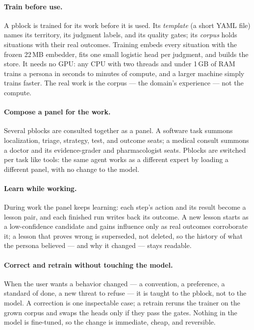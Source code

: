 \documentclass[11pt]{article}
\begin{document}
\paragraph{Train before use.} A pblock is trained for its work before it is used. Its \emph{template} (a short YAML file) names its territory, its judgment labels, and its quality gates; its \emph{corpus} holds situations with their real outcomes. Training embeds every situation with the frozen 22\,MB embedder, fits one small logistic head per judgment, and builds the store. It needs no GPU: any CPU with two threads and under 1\,GB of RAM trains a persona in seconds to minutes of compute, and a larger machine simply trains faster. The real work is the corpus --- the domain's experience --- not the compute.

\paragraph{Compose a panel for the work.} Several pblocks are consulted together as a panel. A software task summons localization, triage, strategy, test, and outcome seats; a medical consult summons a doctor and its evidence-grader and pharmacologist seats. Pblocks are switched per task like tools: the same agent works as a different expert by loading a different panel, with no change to the model.

\paragraph{Learn while working.} During work the panel keeps learning: each step's action and its result become a lesson pair, and each finished run writes back its outcome. A new lesson starts as a low-confidence candidate and gains influence only as real outcomes corroborate it; a lesson that proves wrong is superseded, not deleted, so the history of what the persona believed --- and why it changed --- stays readable.

\paragraph{Correct and retrain without touching the model.} When the user wants a behavior changed --- a convention, a preference, a standard of done, a new threat to refuse --- it is taught to the pblock, not to the model. A correction is one inspectable case; a retrain reruns the trainer on the grown corpus and swaps the heads only if they pass the gates. Nothing in the model is fine-tuned, so the change is immediate, cheap, and reversible.
\end{document}
